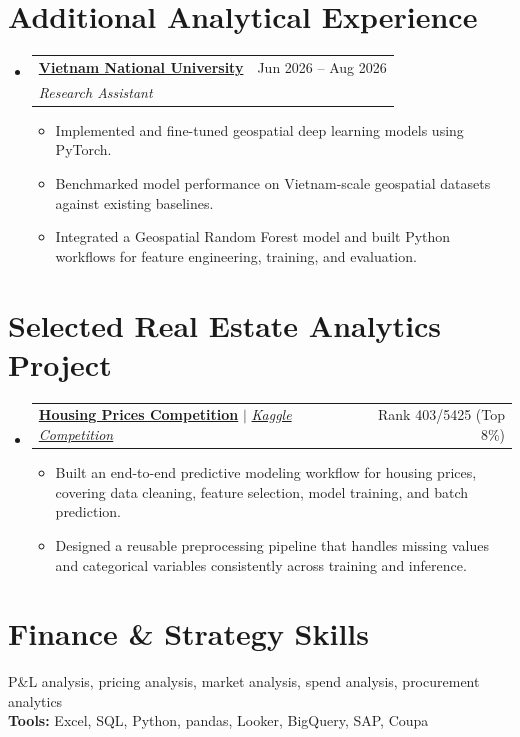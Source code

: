 \documentclass[a4paper,10pt]{article}
\makeatletter
\newcommand{\resumeItem}[1]{
  \item\small{{#1 \vspace{-2pt}}}
}
\newcommand{\resumeSubheading}[4]{
  \vspace{-2pt}\item
    \begin{tabular*}{0.97\textwidth}[t]{l@{\extracolsep{\fill}}r}
      \small\textbf{#1} & \small #2 \\
      \textit{\small #3} & \textit{\small #4} \\
    \end{tabular*}\vspace{-7pt}
}
\newcommand{\resumeProjectHeading}[2]{
  \item
    \begin{tabular*}{0.97\textwidth}{l@{\extracolsep{\fill}}r}
      \small #1 & \small #2 \\
    \end{tabular*}\vspace{-7pt}
}
\newcommand{\resumeSubHeadingListStart}{\begin{itemize}[leftmargin=0.15in,label={}]}
\newcommand{\resumeSubHeadingListEnd}{\end{itemize}}
\newcommand{\resumeItemListStart}{\begin{itemize}[leftmargin=0.22in]}
\newcommand{\resumeItemListEnd}{\end{itemize}\vspace{-5pt}}
\makeatother
\begin{document}
\section{Additional Analytical Experience}
\resumeSubHeadingListStart
  \resumeSubheading
    {\href{https://en.vnu.edu.vn/}{Vietnam National University}}{Jun 2026 -- Aug 2026}
    {Research Assistant}{}
    \resumeItemListStart
      \resumeItem{Implemented and fine-tuned geospatial deep learning models using PyTorch.}
      \resumeItem{Benchmarked model performance on Vietnam-scale geospatial datasets against existing baselines.}
      \resumeItem{Integrated a Geospatial Random Forest model and built Python workflows for feature engineering, training, and evaluation.}
    \resumeItemListEnd
\resumeSubHeadingListEnd

\section{Selected Real Estate Analytics Project}
\resumeSubHeadingListStart
  \resumeProjectHeading
    {\textbf{\href{https://github.com/lhnminh/Kaggle-Housing-Prices-Comp}{Housing Prices Competition}} $|$ \emph{\href{https://www.kaggle.com/competitions/home-data-for-ml-course/overview}{Kaggle Competition}}}{Rank 403/5425 (Top 8\%)}
    \resumeItemListStart
      \resumeItem{Built an end-to-end predictive modeling workflow for housing prices, covering data cleaning, feature selection, model training, and batch prediction.}
      \resumeItem{Designed a reusable preprocessing pipeline that handles missing values and categorical variables consistently across training and inference.}
    \resumeItemListEnd
\resumeSubHeadingListEnd

\section{Finance \& Strategy Skills}
 P\&L analysis, pricing analysis, market analysis, spend analysis, procurement analytics\\
{\bfseries Tools:} Excel, SQL, Python, pandas, Looker, BigQuery, SAP, Coupa
\end{document}
